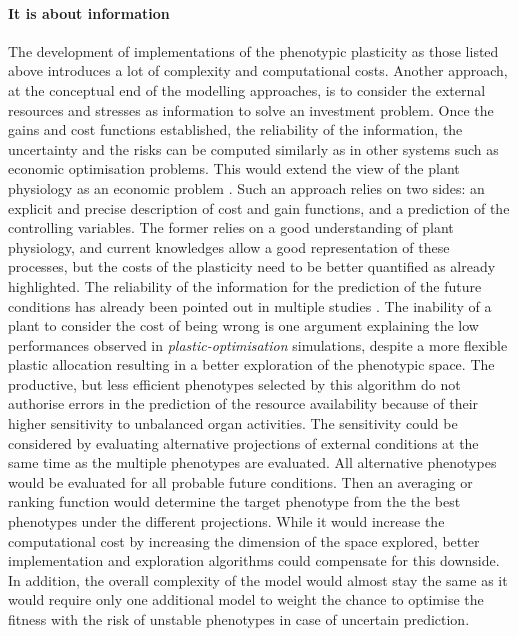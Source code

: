 
%
%

\paragraph{It is about information}

The development of implementations of the phenotypic plasticity as those listed above introduces a lot of complexity and computational costs. Another approach, at the conceptual end of the modelling approaches, is to consider the external resources and stresses as information to solve an investment problem. Once the gains and cost functions established, the reliability of the information, the uncertainty and the risks can be computed similarly as in other systems such as economic optimisation problems. This would extend the view of the plant physiology as an economic problem \parencite{westoby_time_2000, wright_worldwide_2004, mcmurtrie_leaf-trait_2011}. Such an approach relies on two sides: an explicit and precise description of cost and gain functions, and a prediction of the controlling variables. The former relies on a good understanding of plant physiology, and current knowledges allow a good representation of these processes, but the costs of the plasticity need to be better quantified as already highlighted. The reliability of the information for the prediction of the future conditions has already been pointed out in multiple studies \parencite{dewitt_costs_1998, auld_re-evaluating_2009, richter_phenotypic_2012}. The inability of a plant to consider the cost of being wrong is one argument explaining the low performances observed in \textit{plastic-optimisation} simulations, despite a more flexible plastic allocation resulting in a better exploration of the phenotypic space. The productive, but less efficient phenotypes selected by this algorithm do not authorise errors in the prediction of the resource availability because of their higher sensitivity to unbalanced organ activities. The sensitivity could be considered by evaluating alternative projections of external conditions at the same time as the multiple phenotypes are evaluated. All alternative phenotypes would be evaluated for all probable future conditions. Then an averaging or ranking function would determine the target phenotype from the the best phenotypes under the different projections. While it would increase the computational cost by increasing the dimension of the space explored, better implementation and exploration algorithms could compensate for this downside. In addition, the overall complexity of the model would almost stay the same as it would require only one additional model to weight the chance to optimise the fitness with the risk of unstable phenotypes in case of uncertain prediction.

